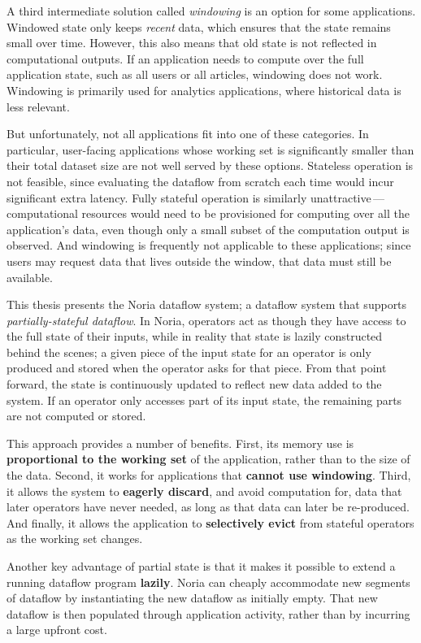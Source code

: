 \documentclass[fontsize=12pt,paper=letter]{scrartcl}
\begin{document}
A third intermediate solution called \emph{windowing} is an option for some
applications. Windowed state only keeps \emph{recent} data, which ensures that
the state remains small over time. However, this also means that old state is
not reflected in computational outputs. If an application needs to compute over
the full application state, such as all users or all articles, windowing does
not work. Windowing is primarily used for analytics applications, where
historical data is less relevant.

But unfortunately, not all applications fit into one of these categories. In
particular, user-facing applications whose working set is significantly smaller
than their total dataset size are not well served by these options. Stateless
operation is not feasible, since evaluating the dataflow from scratch each time
would incur significant extra latency. Fully stateful operation is similarly
unattractive\,---\,computational resources would need to be provisioned for
computing over all the application's data, even though only a small subset of
the computation output is observed. And windowing is frequently not applicable
to these applications; since users may request data that lives outside the
window, that data must still be available.

This thesis presents the Noria dataflow system; a dataflow system that supports
\emph{partially-stateful dataflow}. In Noria, operators act as though they have
access to the full state of their inputs, while in reality that state is lazily
constructed behind the scenes; a given piece of the input state for an operator
is only produced and stored when the operator asks for that piece. From that
point forward, the state is continuously updated to reflect new data added to
the system. If an operator only accesses part of its input state, the remaining
parts are not computed or stored.

This approach provides a number of benefits. First, its memory use is
\textbf{proportional to the working set} of the application, rather than to the
size of the data. Second, it works for applications that \textbf{cannot use
windowing}. Third, it allows the system to \textbf{eagerly discard}, and avoid
computation for, data that later operators have never needed, as long as that
data can later be re-produced. And finally, it allows the application to
\textbf{selectively evict} from stateful operators as the working set changes.

Another key advantage of partial state is that it makes it possible to extend a
running dataflow program \textbf{lazily}. Noria can cheaply accommodate new
segments of dataflow by instantiating the new dataflow as initially empty. That
new dataflow is then populated through application activity, rather than by
incurring a large upfront cost.
\end{document}
